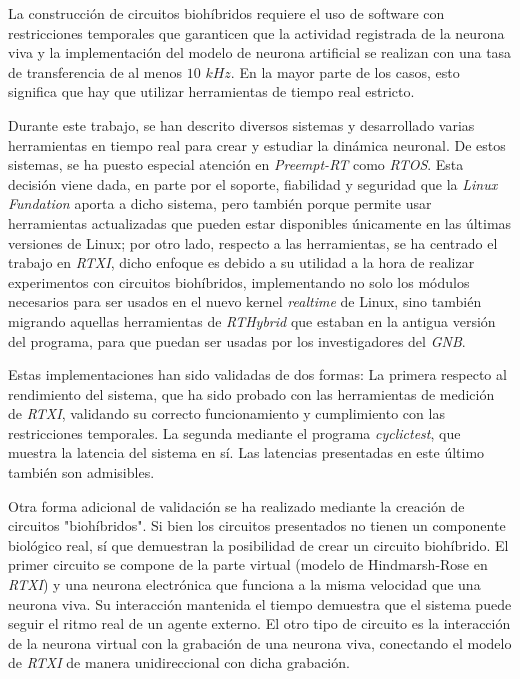 
La construcción de circuitos biohíbridos requiere el uso de software con restricciones temporales que garanticen que la actividad registrada de la neurona viva y la implementación del modelo de neurona artificial se realizan con una tasa de transferencia de al menos $10$ $kHz$. En la mayor parte de los casos, esto significa que hay que utilizar herramientas de tiempo real estricto. 

Durante este trabajo, se han descrito diversos sistemas y desarrollado varias herramientas en tiempo real para crear y estudiar la dinámica neuronal. De estos sistemas, se ha puesto especial atención en \textit{Preempt-RT} como \textit{RTOS}. Esta decisión viene dada, en parte por el soporte, fiabilidad y seguridad que la \textit{Linux Fundation} aporta a dicho sistema, pero también porque permite usar herramientas actualizadas que pueden estar disponibles únicamente en las últimas versiones de Linux; por otro lado, respecto a las herramientas, se ha centrado el trabajo en \textit{RTXI}, dicho enfoque es debido a su utilidad a la hora de realizar experimentos con circuitos biohíbridos, implementando no solo los módulos necesarios para ser usados en el nuevo kernel \textit{realtime} de Linux, sino también migrando aquellas herramientas de \textit{RTHybrid} que estaban en la antigua versión del programa, para que puedan ser usadas por los investigadores del \textit{GNB}. 

Estas implementaciones han sido validadas de dos formas: La primera respecto al rendimiento del sistema, que ha sido probado con las herramientas de medición de \textit{RTXI}, validando su correcto funcionamiento y cumplimiento con las restricciones temporales. La segunda mediante el programa \textit{cyclictest}, que muestra la latencia del sistema en sí. Las latencias presentadas en este último también son admisibles. 

Otra forma adicional de validación se ha realizado mediante la creación de circuitos "biohíbridos". Si bien los circuitos presentados no tienen un componente biológico real, sí que demuestran la posibilidad de crear un circuito biohíbrido. El primer circuito se compone de la parte virtual (modelo de Hindmarsh-Rose en \textit{RTXI}) y una neurona electrónica que funciona a la misma velocidad que una neurona viva. Su interacción mantenida el tiempo demuestra que el sistema puede seguir el ritmo real de un agente externo. El otro tipo de circuito es la interacción de la neurona virtual con la grabación de una neurona viva, conectando el modelo de \textit{RTXI} de manera unidireccional con dicha grabación.

